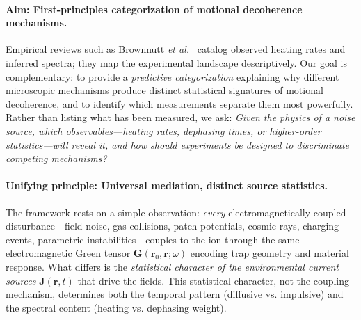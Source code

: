 \paragraph{Aim: First-principles categorization of motional decoherence mechanisms.}
Empirical reviews such as Brownnutt \emph{et al.}~\cite{Brownnutt2015} catalog observed heating rates and inferred spectra; they map the experimental landscape descriptively. Our goal is complementary: to provide a \emph{predictive categorization} explaining why different microscopic mechanisms produce distinct statistical signatures of motional decoherence, and to identify which measurements separate them most powerfully. Rather than listing what has been measured, we ask: \emph{Given the physics of a noise source, which observables—heating rates, dephasing times, or higher-order statistics—will reveal it, and how should experiments be designed to discriminate competing mechanisms?}

\paragraph{Unifying principle: Universal mediation, distinct source statistics.}
The framework rests on a simple observation: \emph{every} electromagnetically coupled disturbance—field noise, gas collisions, patch potentials, cosmic rays, charging events, parametric instabilities—couples to the ion through the same electromagnetic Green tensor $\mathbf{G}(\mathbf{r}_0,\mathbf{r};\omega)$ encoding trap geometry and material response. What differs is the \emph{statistical character of the environmental current sources} $\mathbf{J}(\mathbf{r},t)$ that drive the fields. This statistical character, not the coupling mechanism, determines both the temporal pattern (diffusive vs. impulsive) and the spectral content (heating vs. dephasing weight).

